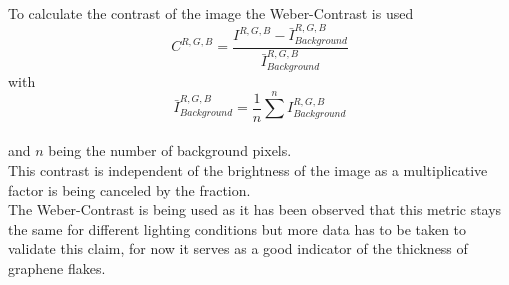 To calculate the contrast of the image the Weber-Contrast is used\\
\begin{equation}
C^{R,G,B} = \frac{I^{R,G,B} - \bar{I}^{R,G,B}_{Background}}
{\bar{I}^{R,G,B}_{Background}}
\end{equation}
with
\begin{equation}
    \bar{I}^{R,G,B}_{Background} = \frac{1}{n} \sum^n I^{R,G,B}_{Background}
\end{equation}
\\
and $n$ being the number of background pixels.\\
This contrast is independent of the brightness of the image as a multiplicative factor is being canceled by the fraction.\\
The Weber-Contrast is being used as it has been observed that this metric stays the same for different lighting conditions but more data has to be taken to validate this claim, for now it serves as a good indicator of the thickness of graphene flakes.\\